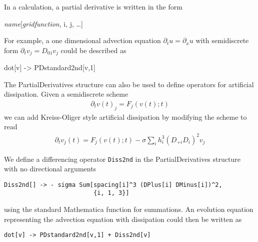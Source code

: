 \documentclass{report}
\begin{document}
In a calculation, a partial derivative is written in the form

\begin{center}
\begin{minipage}{0.8 \textwidth}
\begin{tt}
{\it name}[{\it gridfunction}, i, j, \ldots]
\end{tt}
\end{minipage}
\end{center}

For example, a one dimensional advection equation $\partial_t u =
\partial_x u$ with semidiscrete form $\partial_t v_j = D_{01} v_j$
could be described as

\begin{center}
\begin{minipage}{0.8 \textwidth}
\begin{tt}
dot[v] -> PDstandard2nd[v,1]
\end{tt}
\end{minipage}
\end{center}

The PartialDerivatives structure can also be used to define operators
for artificial dissipation.  Given a semidiscrete scheme
\begin{eqnarray}
\partial_t v(t)_j = F_j(v(t);t)
\end{eqnarray}
we can add Kreiss-Oliger style artificial dissipation by modifying the
scheme to read
\begin{eqnarray}
\partial_t v_j(t) = F_j(v(t);t) - \sigma \sum_i h_i^3 (D_{+i} D_{i})^2 v_j
\end{eqnarray}

We define a differencing operator {\tt Diss2nd} in the
PartialDerivatives structure with no directional arguments

\begin{center}
\begin{minipage}{0.8 \textwidth}
\begin{verbatim}
Diss2nd[] -> - sigma Sum[spacing[i]^3 (DPlus[i] DMinus[i])^2, 
                         {i, 1, 3}]
\end{verbatim}
\end{minipage}
\end{center}

using the standard Mathematica function for summations.  An evolution
equation representing the advection equation with dissipation could
then be written as

\begin{center}
\begin{minipage}{0.8 \textwidth}
\begin{verbatim}
dot[v] -> PDstandard2nd[v,1] + Diss2nd[v]
\end{verbatim}
\end{minipage}
\end{center}
\end{document}
